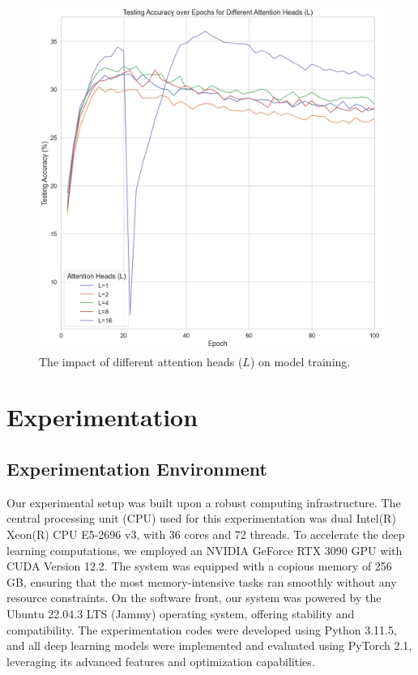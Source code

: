 \documentclass[10pt,twocolumn,letterpaper]{article}
\begin{document}
\begin{figure}[htbp]
\begin{minipage}[t]{0.33\textwidth}
   \end{minipage}
   \begin{minipage}[t]{0.33\textwidth}
      \centering
      \includegraphics[width=\textwidth]{Fig/5.png}
   \end{minipage}
   \caption{The impact of different attention heads (\(L\)) on model training.}
\end{figure}

\section{Experimentation} \label{sec:experimentation}

\subsection{Experimentation Environment}

Our experimental setup was built upon a robust computing infrastructure. The central processing unit (CPU) used for this experimentation was dual Intel(R) Xeon(R) CPU E5-2696 v3, with 36 cores and 72 threads. To accelerate the deep learning computations, we employed an NVIDIA GeForce RTX 3090 GPU with CUDA Version 12.2. The system was equipped with a copious memory of 256 GB, ensuring that the most memory-intensive tasks ran smoothly without any resource constraints. On the software front, our system was powered by the Ubuntu 22.04.3 LTS (Jammy) operating system, offering stability and compatibility. The experimentation codes were developed using Python 3.11.5, and all deep learning models were implemented and evaluated using PyTorch 2.1, leveraging its advanced features and optimization capabilities.
\end{document}
